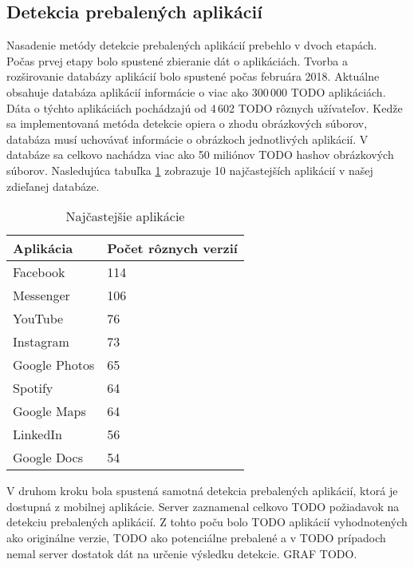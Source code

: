 \subsection{Detekcia prebalených aplikácií}
Nasadenie metódy detekcie prebalených aplikácií prebehlo v dvoch etapách. Počas prvej etapy bolo spustené zbieranie dát o aplikáciách. Tvorba a rozširovanie databázy aplikácií bolo spustené počas februára 2018. Aktuálne obsahuje databáza aplikácií informácie o viac ako 300\,000 TODO aplikáciách. Dáta o týchto aplikáciách pochádzajú od 4\,602 TODO rôznych užívateľov. Kedže sa implementovaná metóda detekcie opiera o zhodu obrázkových súborov, databáza musí uchovávať informácie o obrázkoch jednotlivých aplikácií. V databáze sa celkovo nachádza viac ako 50 miliónov TODO hashov obrázkových súborov.
Nasledujúca tabuľka \ref{apps-common} zobrazuje 10 najčastejších aplikácií v našej zdieľanej databáze.

\begin{table}[]
\centering
\begin{tabular}{|l|l|}
\hline
Aplikácia     & Počet rôznych verzií \\ \hline
Facebook      & 114                  \\
Messenger     & 106                  \\
YouTube       & 76                   \\
Instagram     & 73                   \\
Google Photos & 65                   \\
Spotify       & 64                   \\
Google Maps   & 64                   \\
LinkedIn      & 56                   \\
Google Docs   & 54                   \\ \hline
\end{tabular}
\caption{Najčastejšie aplikácie}
\label{apps-common}
\end{table}

V druhom kroku bola spustená samotná detekcia prebalených aplikácií, ktorá je dostupná z mobilnej aplikácie. Server zaznamenal celkovo TODO požiadavok na detekciu prebalených aplikácií. Z tohto poču bolo TODO aplikácií vyhodnotených ako originálne verzie, TODO ako potenciálne prebalené a v TODO prípadoch nemal server dostatok dát na určenie výsledku detekcie. GRAF TODO.
